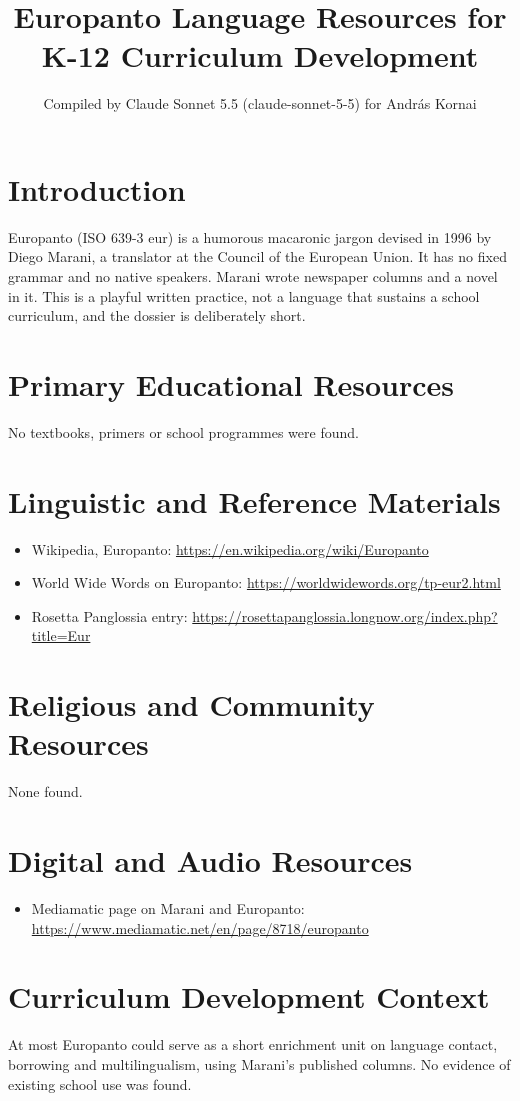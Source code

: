 \documentclass[12pt]{article}
\title{Europanto Language Resources for K-12 Curriculum Development}
\author{Compiled by Claude Sonnet 5.5 (claude-sonnet-5-5) for Andr\'as Kornai}
\date{}
\begin{document}
\maketitle

\section{Introduction}
Europanto (ISO 639-3 eur) is a humorous macaronic jargon devised in 1996 by Diego Marani, a translator at the Council of the European Union. It has no fixed grammar and no native speakers. Marani wrote newspaper columns and a novel in it. This is a playful written practice, not a language that sustains a school curriculum, and the dossier is deliberately short.

\section{Primary Educational Resources}
No textbooks, primers or school programmes were found.

\section{Linguistic and Reference Materials}
\begin{itemize}
\item Wikipedia, Europanto: \url{https://en.wikipedia.org/wiki/Europanto}
\item World Wide Words on Europanto: \url{https://worldwidewords.org/tp-eur2.html}
\item Rosetta Panglossia entry: \url{https://rosettapanglossia.longnow.org/index.php?title=Eur}
\end{itemize}

\section{Religious and Community Resources}
None found.

\section{Digital and Audio Resources}
\begin{itemize}
\item Mediamatic page on Marani and Europanto: \url{https://www.mediamatic.net/en/page/8718/europanto}
\end{itemize}

\section{Curriculum Development Context}
At most Europanto could serve as a short enrichment unit on language contact, borrowing and multilingualism, using Marani's published columns. No evidence of existing school use was found.
\end{document}
